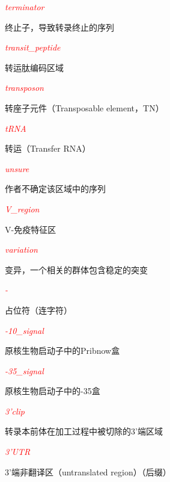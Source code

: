 \textcolor{red}{\textit{terminator}}
\begin{adjustwidth}{4em}{}
终止子，导致转录终止的序列
\end{adjustwidth}

\textcolor{red}{\textit{transit\_peptide}}
\begin{adjustwidth}{4em}{}
转运肽编码区域
\end{adjustwidth}

\textcolor{red}{\textit{transposon}}
\begin{adjustwidth}{4em}{}
转座子元件（Transposable element，TN）
\end{adjustwidth}

\textcolor{red}{\textit{tRNA}}
\begin{adjustwidth}{4em}{}
转运（Transfer RNA）
\end{adjustwidth}

\textcolor{red}{\textit{unsure}}
\begin{adjustwidth}{4em}{}
作者不确定该区域中的序列
\end{adjustwidth}

\textcolor{red}{\textit{V\_region}}
\begin{adjustwidth}{4em}{}
V-免疫特征区
\end{adjustwidth}

\textcolor{red}{\textit{variation}}
\begin{adjustwidth}{4em}{}
变异，一个相关的群体包含稳定的突变
\end{adjustwidth}

\textcolor{red}{\textit{-}}
\begin{adjustwidth}{4em}{}
占位符（连字符）
\end{adjustwidth}

\textcolor{red}{\textit{-10\_signal}}
\begin{adjustwidth}{4em}{}
原核生物启动子中的Pribnow盒
\end{adjustwidth}

\textcolor{red}{\textit{-35\_signal}}
\begin{adjustwidth}{4em}{}
原核生物启动子中的-35盒
\end{adjustwidth}

\textcolor{red}{\textit{3'clip}}
\begin{adjustwidth}{4em}{}
转录本前体在加工过程中被切除的3'端区域
\end{adjustwidth}

\textcolor{red}{\textit{3'UTR}}
\begin{adjustwidth}{4em}{}
3'端非翻译区（untranslated region）（后缀）
\end{adjustwidth}

